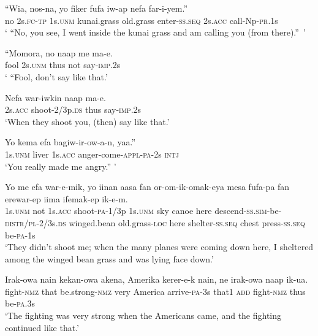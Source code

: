 {\ea\label{ex:a:x81}
\gll  “Wia,  nos-na,  yo  fiker  fufa  iw-ap nefa  far-i-yem.” \\
no  2s.\textsc{fc}-\textsc{tp}  1s.\textsc{unm}  kunai.grass  old.grass  enter-\textsc{ss.seq} 2s.\textsc{acc}  call-Np-\textsc{pr}.1s \\
\glt ‘ “No, you see, I went inside the kunai grass and am calling you (from there).”~’ \\
\z


\ea\label{ex:a:x82}
\gll  “Momora,  no  naap  me  ma-e. \\
fool  2s.\textsc{unm}  thus  not  say-\textsc{imp}.2s \\
\glt ‘ “Fool, don’t say like that.’ \\
\z


\ea\label{ex:a:x83}
\gll  Nefa  war-iwkin  naap  ma-e. \\
2s.\textsc{acc}  shoot-2/3p.\textsc{ds}  thus  say-\textsc{imp}.2s \\
\glt ‘When they shoot you, (then) say like that.’ \\
\z


\ea\label{ex:a:x84}
\gll  Yo  kema  efa  bagiw-ir-ow-a-n,  yaa.” \\
1s.\textsc{unm}  liver  1s.\textsc{acc}  anger-come-\textsc{appl}-\textsc{pa}-2s  \textsc{intj} \\
\glt ‘You really made me angry.” ’ \\
\z


\ea\label{ex:a:x85}
\gll  Yo  me  efa  war-e-mik,  yo  iinan  aasa  fan or-om-ik-omak-eya  mesa  fufa-pa  fan  erewar-ep  iima  ifemak-ep  ik-e-m. \\
1s.\textsc{unm}  not  1s.\textsc{acc}  shoot-\textsc{pa}-1/3p  1s.\textsc{unm}  sky  canoe  here descend-\textsc{ss}.\textsc{sim}-be-\textsc{distr}/\textsc{pl}-2/3s.\textsc{ds}  winged.bean  old.grass-\textsc{loc} here  shelter-\textsc{ss.seq}  chest  press-\textsc{ss.seq}  be-\textsc{pa}-1s \\
\glt ‘They didn’t shoot me; when the many planes were coming down here, I sheltered among the winged bean grass and was lying face down.’ \\
\z


\ea\label{ex:a:x86}
\gll  Irak-owa  nain  kekan-owa  akena,  Amerika  kerer-e-k  nain,  ne  irak-owa  naap  ik-ua. \\
fight-\textsc{nmz}  that  be.strong-\textsc{nmz}  very  America  arrive-\textsc{pa}-3s  that1 \textsc{add}  fight-\textsc{nmz}  thus  be-\textsc{pa}.3s \\
\glt ‘The fighting was very strong when the Americans came, and the fighting continued like that.’ \\
\z


}
